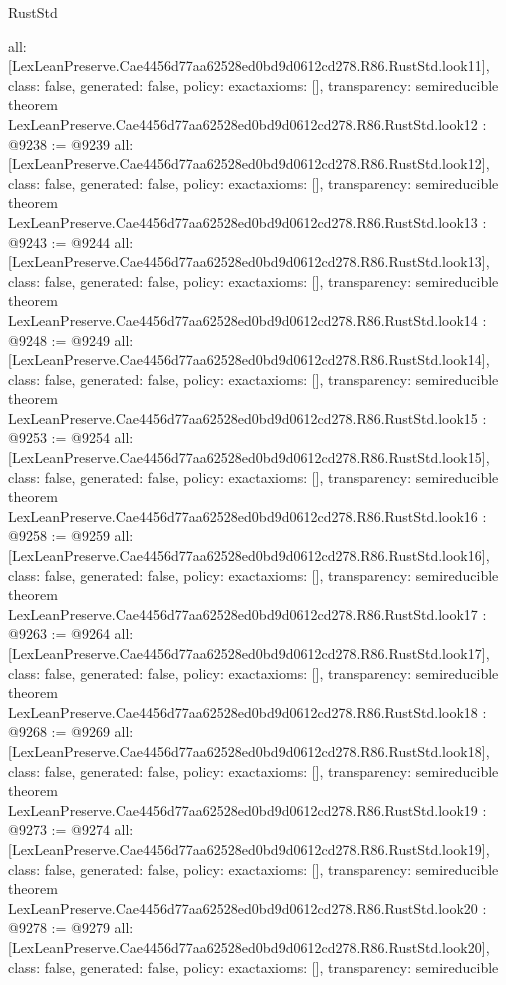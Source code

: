 \begin{lexlean}{RustStd}
\begin{coremodule}
{  all: [LexLeanPreserve.Cae4456d77aa62528ed0bd9d0612cd278.R86.RustStd.look11],
  class: false,
  generated: false,
  policy: exact{axioms: []},
  transparency: semireducible
}
theorem LexLeanPreserve.Cae4456d77aa62528ed0bd9d0612cd278.R86.RustStd.look12 : @9238 := @9239 {
  all: [LexLeanPreserve.Cae4456d77aa62528ed0bd9d0612cd278.R86.RustStd.look12],
  class: false,
  generated: false,
  policy: exact{axioms: []},
  transparency: semireducible
}
theorem LexLeanPreserve.Cae4456d77aa62528ed0bd9d0612cd278.R86.RustStd.look13 : @9243 := @9244 {
  all: [LexLeanPreserve.Cae4456d77aa62528ed0bd9d0612cd278.R86.RustStd.look13],
  class: false,
  generated: false,
  policy: exact{axioms: []},
  transparency: semireducible
}
theorem LexLeanPreserve.Cae4456d77aa62528ed0bd9d0612cd278.R86.RustStd.look14 : @9248 := @9249 {
  all: [LexLeanPreserve.Cae4456d77aa62528ed0bd9d0612cd278.R86.RustStd.look14],
  class: false,
  generated: false,
  policy: exact{axioms: []},
  transparency: semireducible
}
theorem LexLeanPreserve.Cae4456d77aa62528ed0bd9d0612cd278.R86.RustStd.look15 : @9253 := @9254 {
  all: [LexLeanPreserve.Cae4456d77aa62528ed0bd9d0612cd278.R86.RustStd.look15],
  class: false,
  generated: false,
  policy: exact{axioms: []},
  transparency: semireducible
}
theorem LexLeanPreserve.Cae4456d77aa62528ed0bd9d0612cd278.R86.RustStd.look16 : @9258 := @9259 {
  all: [LexLeanPreserve.Cae4456d77aa62528ed0bd9d0612cd278.R86.RustStd.look16],
  class: false,
  generated: false,
  policy: exact{axioms: []},
  transparency: semireducible
}
theorem LexLeanPreserve.Cae4456d77aa62528ed0bd9d0612cd278.R86.RustStd.look17 : @9263 := @9264 {
  all: [LexLeanPreserve.Cae4456d77aa62528ed0bd9d0612cd278.R86.RustStd.look17],
  class: false,
  generated: false,
  policy: exact{axioms: []},
  transparency: semireducible
}
theorem LexLeanPreserve.Cae4456d77aa62528ed0bd9d0612cd278.R86.RustStd.look18 : @9268 := @9269 {
  all: [LexLeanPreserve.Cae4456d77aa62528ed0bd9d0612cd278.R86.RustStd.look18],
  class: false,
  generated: false,
  policy: exact{axioms: []},
  transparency: semireducible
}
theorem LexLeanPreserve.Cae4456d77aa62528ed0bd9d0612cd278.R86.RustStd.look19 : @9273 := @9274 {
  all: [LexLeanPreserve.Cae4456d77aa62528ed0bd9d0612cd278.R86.RustStd.look19],
  class: false,
  generated: false,
  policy: exact{axioms: []},
  transparency: semireducible
}
theorem LexLeanPreserve.Cae4456d77aa62528ed0bd9d0612cd278.R86.RustStd.look20 : @9278 := @9279 {
  all: [LexLeanPreserve.Cae4456d77aa62528ed0bd9d0612cd278.R86.RustStd.look20],
  class: false,
  generated: false,
  policy: exact{axioms: []},
  transparency: semireducible
}
\end{coremodule}
\end{lexlean}
